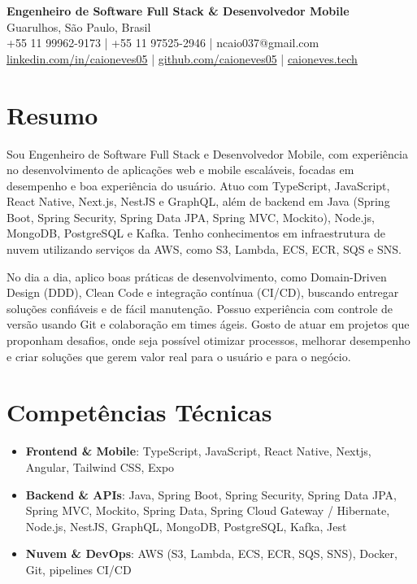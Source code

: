 \documentclass[11pt,letterpaper]{article}
\begin{document}
\begin{center}
    \textbf{\Large Engenheiro de Software Full Stack \& Desenvolvedor Mobile} \\
    \vspace{5pt}
    Guarulhos, São Paulo, Brasil \\
    +55 11 99962-9173 | +55 11 97525-2946 | ncaio037@gmail.com \\
    \href{https://www.linkedin.com/in/caioneves05}{linkedin.com/in/caioneves05} |
    \href{https://github.com/caioneves05}{github.com/caioneves05} |
    \href{http://caioneves.tech}{caioneves.tech}
\end{center}

\section{Resumo}
Sou Engenheiro de Software Full Stack e Desenvolvedor Mobile, com experiência no desenvolvimento de aplicações web e mobile escaláveis, focadas em desempenho e boa experiência do usuário. Atuo com TypeScript, JavaScript, React Native, Next.js, NestJS e GraphQL, além de backend em Java (Spring Boot, Spring Security, Spring Data JPA, Spring MVC, Mockito), Node.js, MongoDB, PostgreSQL e Kafka. Tenho conhecimentos em infraestrutura de nuvem utilizando serviços da AWS, como S3, Lambda, ECS, ECR, SQS e SNS.

No dia a dia, aplico boas práticas de desenvolvimento, como Domain-Driven Design (DDD), Clean Code e integração contínua (CI/CD), buscando entregar soluções confiáveis e de fácil manutenção. Possuo experiência com controle de versão usando Git e colaboração em times ágeis. Gosto de atuar em projetos que proponham desafios, onde seja possível otimizar processos, melhorar desempenho e criar soluções que gerem valor real para o usuário e para o negócio.

\section{Competências Técnicas}
\begin{itemize}[leftmargin=*]
    \item \textbf{Frontend \& Mobile}: TypeScript, JavaScript, React Native, Nextjs, Angular, Tailwind CSS, Expo
    \item \textbf{Backend \& APIs}: Java, Spring Boot, Spring Security, Spring Data JPA, Spring MVC, Mockito,  Spring Data, Spring Cloud Gateway / Hibernate,  Node.js, NestJS, GraphQL, MongoDB, PostgreSQL, Kafka, Jest
    \item \textbf{Nuvem \& DevOps}: AWS (S3, Lambda, ECS, ECR, SQS, SNS), Docker, Git, pipelines CI/CD
\end{itemize}
\end{document}
